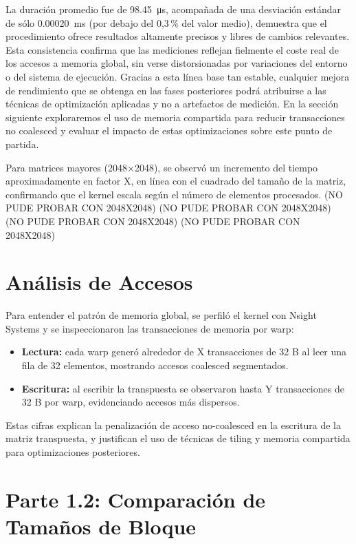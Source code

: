 \documentclass[a4paper,11pt]{article}
\begin{document}
La duración promedio fue de \SI{98.45}{\micro\second}, acompañada de una desviación estándar de sólo \SI{0.00020}{\milli\second} (por debajo del 0,3\,\% del valor medio), demuestra que el procedimiento ofrece resultados altamente precisos y libres de cambios relevantes. Esta consistencia confirma que las mediciones reflejan fielmente el coste real de los accesos a memoria global, sin verse distorsionadas por variaciones del entorno o del sistema de ejecución. Gracias a esta línea base tan estable, cualquier mejora de rendimiento que se obtenga en las fases posteriores podrá atribuirse a las técnicas de optimización aplicadas y no a artefactos de medición. En la sección siguiente exploraremos el uso de memoria compartida para reducir transacciones no coalesced y evaluar el impacto de estas optimizaciones sobre este punto de partida.


Para matrices mayores (2048×2048), se observó un incremento del tiempo aproximadamente en factor X, en línea con el cuadrado del tamaño de la matriz, confirmando que el kernel escala según el número de elementos procesados. (NO PUDE PROBAR CON 2048X2048) (NO PUDE PROBAR CON 2048X2048) (NO PUDE PROBAR CON 2048X2048) (NO PUDE PROBAR CON 2048X2048)


\section{Análisis de Accesos}
Para entender el patrón de memoria global, se perfiló el kernel con Nsight Systems y se inspeccionaron las transacciones de memoria por warp:
\begin{itemize}[noitemsep]
  \item \textbf{Lectura:} cada warp generó alrededor de X transacciones de 32 B al leer una fila de 32 elementos, mostrando accesos coalesced segmentados.
  \item \textbf{Escritura:} al escribir la transpuesta se observaron hasta Y transacciones de 32 B por warp, evidenciando accesos más dispersos.
\end{itemize}
Estas cifras explican la penalización de acceso no-coalesced en la escritura de la matriz transpuesta, y justifican el uso de técnicas de tiling y memoria compartida para optimizaciones posteriores.


\section{Parte 1.2: Comparación de Tamaños de Bloque}
\end{document}
